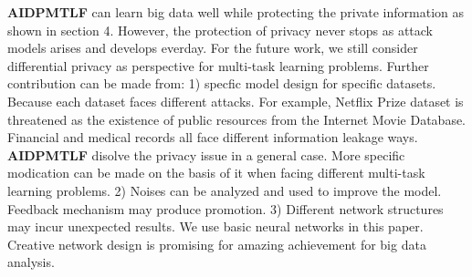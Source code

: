 
\textbf{AIDPMTLF} can learn big data well while protecting the private information as shown in section 4. However, the protection of privacy never stops as attack models arises and develops everday. For the future work, we still consider differential privacy as perspective for multi-task learning problems. Further contribution can be made from: 1) specfic model design for specific datasets. Because each dataset faces different attacks. For example, Netflix Prize dataset is threatened as the existence of public resources from the Internet Movie Database. Financial and medical records all face different information leakage ways. \textbf{AIDPMTLF} disolve the privacy issue in a general case. More specific modication can be made on the basis of it when facing different multi-task learning problems. 2) Noises can be analyzed and used to improve the model. Feedback mechanism may produce promotion. 3) Different network structures may incur unexpected results. We use basic neural networks in this paper. Creative network design is promising for amazing achievement for big data analysis.